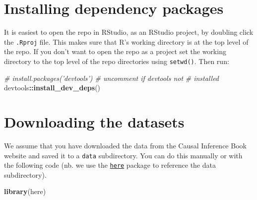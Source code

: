 \documentclass[
  10pt,
]{book}
\newenvironment{Shaded}{\begin{snugshade}}{\end{snugshade}}
\newcommand{\CommentTok}[1]{\textcolor[rgb]{0.56,0.35,0.01}{\textit{#1}}}
\newcommand{\KeywordTok}[1]{\textcolor[rgb]{0.13,0.29,0.53}{\textbf{#1}}}
\newcommand{\NormalTok}[1]{#1}
\newcommand{\OperatorTok}[1]{\textcolor[rgb]{0.81,0.36,0.00}{\textbf{#1}}}
\begin{document}
\hypertarget{installing-dependency-packages}{%
\section{Installing dependency packages}\label{installing-dependency-packages}}

It is easiest to open the repo in RStudio, as an RStudio project, by doubling click the \texttt{.Rproj} file. This makes sure that R's working directory is at the top level of the repo. If you don't want to open the repo as a project set the working directory to the top level of the repo directories using \texttt{setwd()}. Then run:

\begin{Shaded}
\begin{Highlighting}[]
\CommentTok{# install.packages('devtools') # uncomment if devtools not}
\CommentTok{# installed}
\NormalTok{devtools}\OperatorTok{::}\KeywordTok{install_dev_deps}\NormalTok{()}
\end{Highlighting}
\end{Shaded}

\hypertarget{downloading-the-datasets}{%
\section{Downloading the datasets}\label{downloading-the-datasets}}

We assume that you have downloaded the data from the Causal Inference Book website and saved it to a \texttt{data} subdirectory. You can do this manually or with the following code (nb. we use the \href{https://here.r-lib.org/}{\texttt{here}} package to reference the data subdirectory).

\begin{Shaded}
\begin{Highlighting}[]
\KeywordTok{library}\NormalTok{(here)}
\end{Highlighting}
\end{Shaded}
\end{document}
